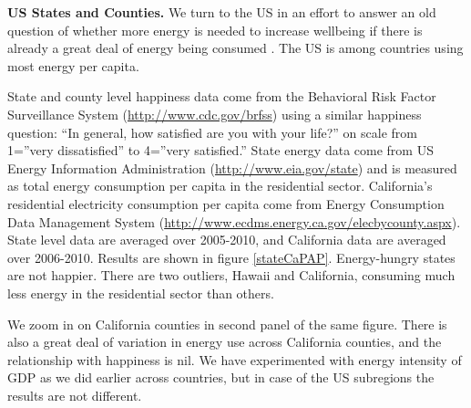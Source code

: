 \documentclass[10pt, letterpaper]{article}
\begin{document}
\begin{spacing}{1.5}
\textbf{US States and Counties.} We turn to the US in an effort to answer
an old question of whether more energy is needed to increase wellbeing if there
is already a great deal of energy being consumed \citep{mazur74}. The US is among
countries using most energy per capita.
%

State and county level happiness data come from the Behavioral Risk Factor
Surveillance System (\url{http://www.cdc.gov/brfss}) using a similar happiness question: ``In general,
how satisfied are you with your life?'' on scale 
from 1=''very dissatisfied'' to 4=''very satisfied.'' State energy  data come from
US Energy Information Administration (\url{http://www.eia.gov/state})  and is measured as total energy
consumption per capita in the residential sector.  
California's  residential electricity consumption per capita come from 
Energy Consumption Data Management System
(\url{http://www.ecdms.energy.ca.gov/elecbycounty.aspx}). State level data are
averaged over 2005-2010, and California data are
averaged over 2006-2010.
Results are shown in
figure \ref{stateCaPAP}. Energy-hungry states  are not happier. %
 There are two outliers, Hawaii and California, consuming much less energy in
the residential sector than others. 

We zoom in on California counties in
second panel of the same figure. There is also a great deal of variation in energy
use across California counties, and the relationship with happiness is nil. 
We have  experimented with energy intensity of
GDP as we did earlier across countries, but in case of the US subregions the results are
not different. %


\end{spacing}
\end{document}
